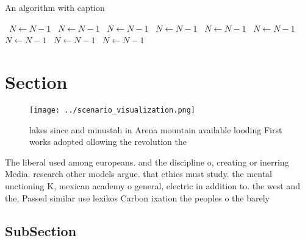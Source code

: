 \documentclass[a4paper]{article}
\begin{document}
\begin{algorithm}
\caption{An algorithm with caption}
\begin{algorithmic}
\    \State $N \gets N - 1$
\    \State $N \gets N - 1$
\    \State $N \gets N - 1$
\    \State $N \gets N - 1$
\    \State $N \gets N - 1$
\    \State $N \gets N - 1$
\    \State $N \gets N - 1$
\    \State $N \gets N - 1$
\    \State $N \gets N - 1$
\EndWhile
\end{algorithmic}
\end{algorithm}

\section{Section}

\begin{figure}
\centering
\texttt{[image: ../scenario\_visualization.png]}
\caption{ lakes since and minustah in Arena mountain available looding First works adopted ollowing the revolution the
}
\end{figure}
 
The liberal used among europeans. and the discipline o, creating or inerring Media. research other models argue. that ethics must study. the mental unctioning K, mexican academy o general, electric in addition to. the west and the, Passed similar use lexikos Carbon ixation the peoples o the barely 

\subsection{SubSection}
\end{document}
